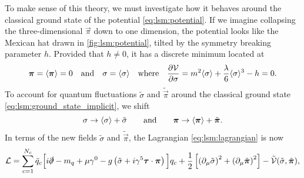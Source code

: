 To make sense of this theory, we must investigate how it behaves around the classical ground state of the potential \eqref{eq:lsm:potential}.
If we imagine collapsing the three-dimensional $\vec{\pi}$ down to one dimension, the potential looks like the Mexican hat drawn in \cref{fig:lsm:potential}, tilted by the symmetry breaking parameter $h$.
Provided that $h \neq 0$, it has a discrete minimum located at
\begin{equation}
	{\bm{\pi}} = \langle {\bm{\pi}} \rangle = 0
	\quad \text{and} \quad
	\sigma = \langle \sigma \rangle
	\quad \text{where} \quad
	\pdv{\mathcal{V}}{\sigma} = m^2 \langle \sigma \rangle + \frac{\lambda}{6} \langle \sigma \rangle^3 - h = 0.
\label{eq:lsm:ground_state_implicit}
\end{equation}
To account for quantum fluctuations $\tilde{\sigma}$ and $\tilde{\vec{\pi}}$ around the classical ground state \eqref{eq:lsm:ground_state_implicit}, we shift
\begin{equation}
	\sigma \rightarrow \left\langle \sigma \right\rangle + \tilde{\sigma}
	\qquad \text{and} \qquad
	{\bm{\pi}} \rightarrow \left\langle {\bm{\pi}} \right\rangle + \tilde{{\bm{\pi}}}.
\label{eq:lsm:field_shift}
\end{equation}
In terms of the new fields $\tilde\sigma$ and $\tilde{\vec\pi}$, the Lagrangian \eqref{eq:lsm:lagrangian} is now
\begin{equation}
	\lagr = \sum_{c=1}^{N_c} \bar{q}_c \Big[ i \slashed\partial - m_q + \mu \gamma^0 - g \left( \tilde{\sigma} + i \gamma^5 \vec\tau \cdot \vec\pi \right) \Big] q_c
	      + \frac12 \left[ \left( \partial_\mu \tilde{\sigma} \right)^2 + \left( \partial_\mu \tilde{\vec\pi} \right)^2 \right] - \tilde{\pot}(\tilde{\sigma},\tilde{\vec\pi}) , %
\end{equation}
